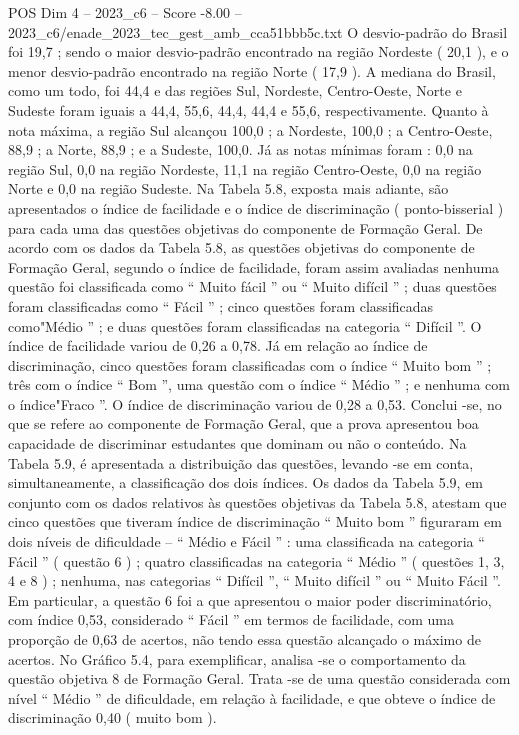 \begin{textsample}{POS Dim 4 – 2023\_c6 – Score -8.00 – 2023\_c6/enade\_2023\_tec\_gest\_amb\_cca51bbb5c.txt}
O desvio-padrão do Brasil foi 19,7 ; sendo o maior desvio-padrão encontrado na região Nordeste ( 20,1 ), e o menor desvio-padrão encontrado na região Norte ( 17,9 ).
A mediana do Brasil, como um todo, foi 44,4 e das regiões Sul, Nordeste, Centro-Oeste, Norte e Sudeste foram iguais a 44,4, 55,6, 44,4, 44,4 e 55,6, respectivamente.
Quanto à nota máxima, a região Sul alcançou 100,0 ; a Nordeste, 100,0 ; a Centro-Oeste, 88,9 ; a Norte, 88,9 ; e a Sudeste, 100,0.
Já as notas mínimas foram : 0,0 na região Sul, 0,0 na região Nordeste, 11,1 na região Centro-Oeste, 0,0 na região Norte e 0,0 na região Sudeste.
Na Tabela 5.8, exposta mais adiante, são apresentados o índice de facilidade e o índice de discriminação ( ponto-bisserial ) para cada uma das questões objetivas do componente de Formação Geral.
De acordo com os dados da Tabela 5.8, as questões objetivas do componente de Formação Geral, segundo o índice de facilidade, foram assim avaliadas nenhuma questão foi classificada como “ Muito fácil ” ou “ Muito difícil ” ; duas questões foram classificadas como “ Fácil ” ; cinco questões foram classificadas como"Médio ” ; e duas questões foram classificadas na categoria “ Difícil ”.
O índice de facilidade variou de 0,26 a 0,78.
Já em relação ao índice de discriminação, cinco questões foram classificadas com o índice “ Muito bom ” ; três com o índice “ Bom ”, uma questão com o índice “ Médio ” ; e nenhuma com o índice"Fraco ”.
O índice de discriminação variou de 0,28 a 0,53.
Conclui -se, no que se refere ao componente de Formação Geral, que a prova apresentou boa capacidade de discriminar estudantes que dominam ou não o conteúdo.
Na Tabela 5.9, é apresentada a distribuição das questões, levando -se em conta, simultaneamente, a classificação dos dois índices.
Os dados da Tabela 5.9, em conjunto com os dados relativos às questões objetivas da Tabela 5.8, atestam que cinco questões que tiveram índice de discriminação “ Muito bom ” figuraram em dois níveis de dificuldade – “ Médio e Fácil ” : uma classificada na categoria “ Fácil ” ( questão 6 ) ; quatro classificadas na categoria “ Médio ” ( questões 1, 3, 4 e 8 ) ; nenhuma, nas categorias “ Difícil ”, “ Muito difícil ” ou “ Muito Fácil ”.
Em particular, a questão 6 foi a que apresentou o maior poder discriminatório, com índice 0,53, considerado “ Fácil ” em termos de facilidade, com uma proporção de 0,63 de acertos, não tendo essa questão alcançado o máximo de acertos.
No Gráfico 5.4, para exemplificar, analisa -se o comportamento da questão objetiva 8 de Formação Geral.
Trata -se de uma questão considerada com nível “ Médio ” de dificuldade, em relação à facilidade, e que obteve o índice de discriminação 0,40 ( muito bom ).

\end{textsample}
